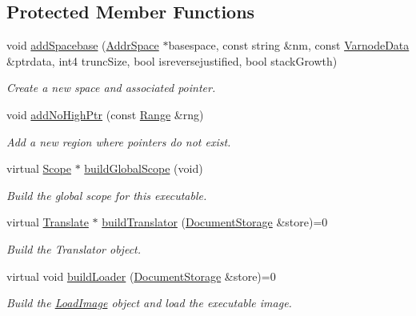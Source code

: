 \subsection*{Protected Member Functions}
\begin{DoxyCompactItemize}
\item 
void \mbox{\hyperlink{class_architecture_a3bbc62dedbb13b6fdb2969e1e83446d5}{add\+Spacebase}} (\mbox{\hyperlink{class_addr_space}{Addr\+Space}} $\ast$basespace, const string \&nm, const \mbox{\hyperlink{struct_varnode_data}{Varnode\+Data}} \&ptrdata, int4 trunc\+Size, bool isreversejustified, bool stack\+Growth)
\begin{DoxyCompactList}\small\item\em Create a new space and associated pointer. \end{DoxyCompactList}\item 
void \mbox{\hyperlink{class_architecture_a70efc8f5d9e212d039dccbfe8556f05d}{add\+No\+High\+Ptr}} (const \mbox{\hyperlink{class_range}{Range}} \&rng)
\begin{DoxyCompactList}\small\item\em Add a new region where pointers do not exist. \end{DoxyCompactList}\item 
virtual \mbox{\hyperlink{class_scope}{Scope}} $\ast$ \mbox{\hyperlink{class_architecture_afa2d6a96b669efefe4b89915aa8a65f7}{build\+Global\+Scope}} (void)
\begin{DoxyCompactList}\small\item\em Build the global scope for this executable. \end{DoxyCompactList}\item 
virtual \mbox{\hyperlink{class_translate}{Translate}} $\ast$ \mbox{\hyperlink{class_architecture_ab951056481cac3e73770db9d567d5212}{build\+Translator}} (\mbox{\hyperlink{class_document_storage}{Document\+Storage}} \&store)=0
\begin{DoxyCompactList}\small\item\em Build the Translator object. \end{DoxyCompactList}\item 
virtual void \mbox{\hyperlink{class_architecture_a9a19e1f07ba0449dfb21d3388b0dbc33}{build\+Loader}} (\mbox{\hyperlink{class_document_storage}{Document\+Storage}} \&store)=0
\begin{DoxyCompactList}\small\item\em Build the \mbox{\hyperlink{class_load_image}{Load\+Image}} object and load the executable image. \end{DoxyCompactList}\item 

\end{DoxyCompactItemize}
